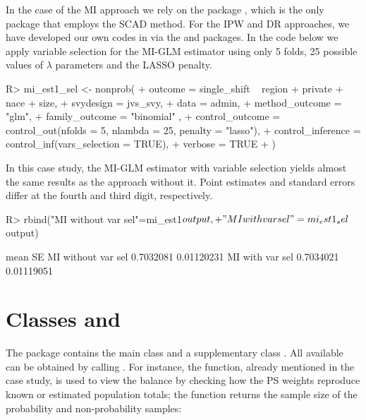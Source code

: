 \documentclass[
]{jss}
\begin{document}
In the case of the MI approach we rely on the  package
\citep{ncvreg}, which is the only  package that employs the
SCAD method. For the IPW and DR approaches, we have developed our own
codes in  via the  and 
packages. In the code below we apply variable selection for the MI-GLM
estimator using only 5 folds, 25 possible values of \(\lambda\)
parameters and the LASSO penalty.

\begin{CodeChunk}
\begin{CodeInput}
R> mi_est1_sel <- nonprob(
+   outcome = single_shift ~ region + private + nace + size,
+   svydesign = jvs_svy,
+   data = admin,
+   method_outcome = "glm",
+   family_outcome = "binomial" ,
+   control_outcome = control_out(nfolds = 5, nlambda = 25, penalty = "lasso"),
+   control_inference = control_inf(vars_selection = TRUE),
+   verbose = TRUE
+ )
\end{CodeInput}
\end{CodeChunk}

In this case study, the MI-GLM estimator with variable selection yields
almost the same results as the approach without it. Point estimates and
standard errors differ at the fourth and third digit, respectively.

\begin{CodeChunk}
\begin{CodeInput}
R> rbind("MI without var sel"=mi_est1$output,
+       "MI with var sel"=mi_est1_sel$output)
\end{CodeInput}
\begin{CodeOutput}
                        mean         SE
MI without var sel 0.7032081 0.01120231
MI with var sel    0.7034021 0.01119051
\end{CodeOutput}
\end{CodeChunk}

\section[Classes and S3Methods]{Classes and }\label{sec-s3methods}

The package contains the main class  and a
supplementary class . All available
 can be obtained by calling
. For instance, the
 function, already mentioned in the case study, is
used to view the balance by checking how the PS weights reproduce known
or estimated population totals; the  function returns the
sample size of the probability and non-probability samples:
\end{document}
